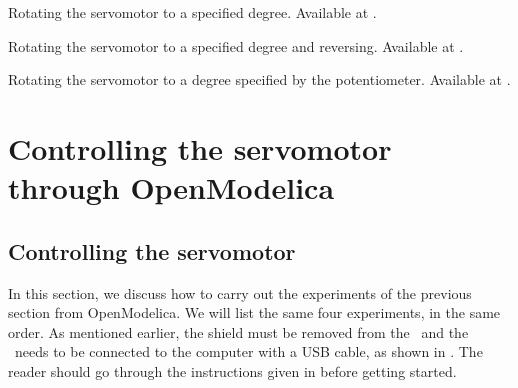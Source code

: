 \begin{juliacode}
   {Rotating
    the servomotor to a specified degree.  Available at
    .}
  \label{julia:servo-init}
  
\end{juliacode}

\begin{juliacode}
   {Rotating
    the servomotor to a specified degree and reversing.  Available at
    .}
  \label{julia:servo-reverse}
  
\end{juliacode}

\begin{juliacode}
  \label{julia:servo-loop}
  
\end{juliacode}

\begin{juliacode}
   {Rotating the servomotor to a degree specified by
    the potentiometer.  Available at .}
  \label{julia:servo-pot}
  
\end{juliacode}

\section{Controlling the servomotor through OpenModelica}
\subsection{Controlling the servomotor}
\label{sec:servo-OpenModelica}
In this section, we discuss how to carry out the experiments of the
previous section from OpenModelica.  We will list the same four experiments,
in the same order.  As mentioned earlier, the shield must be removed from 
the \arduino\ and the \arduino\ needs to be connected to the computer 
with a USB cable, as shown in . The reader should go through the instructions given in
 before getting started.

